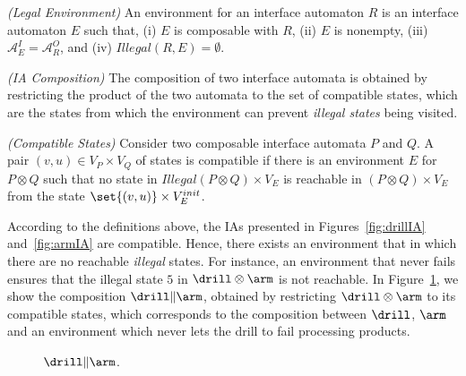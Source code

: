 \begin{definition}\label{def:IAlegalEnvironment}\emph{(Legal Environment)}
An environment for an interface automaton $R$ is an interface
automaton $E$ such that, (i) $E$ is composable with $R$, (ii) $E$
is nonempty, (iii) $\mathcal{A}_E^I=\mathcal{A}_R^O$, and (iv)
$Illegal(R,E)=\emptyset$.
\end{definition}

\begin{definition}\label{def:IAComposition}\emph{(IA Composition)}
The composition of two interface automata is obtained by
restricting the product of the two automata to the set of
compatible states, which are the states from which the environment
can prevent \emph{illegal states} being visited.
\end{definition}


\begin{definition} \label{def:comp-states}\emph{(Compatible States)}
Consider two composable interface automata $P$ and $Q$. A pair $(v,
u)\in V_P\times V_Q$ of states is compatible if there is an
environment $E$ for $P\otimes Q$ such that no state in
$Illegal(P\otimes Q)\times V_E$ is reachable in $(P\otimes Q)\times
V_E$ from the state $\set{(v,u)}\times V_E^{init}$.
\end{definition}

According to the definitions above, the IAs presented in
Figures~\ref{fig:drillIA} and~\ref{fig:armIA} are compatible.
Hence, there exists an environment that in which there are no
reachable \emph{illegal} states. For instance, an environment that
never fails ensures that the illegal state $5$ in
$\drill\otimes\arm$ is not reachable. In
Figure~\ref{fig:IAcomposition}, we show the composition
$\drill\|\arm$, obtained by restricting $\drill\otimes\arm$ to its
compatible states, which corresponds to the composition between
$\drill$, $\arm$ and an environment which never lets the drill to
fail processing products.

\begin{figure}[bt]
\centering
\caption{$\drill \| \arm$.}
\label{fig:IAcomposition}
\end{figure}

